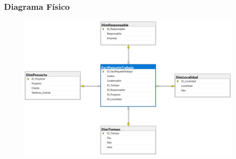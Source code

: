 \documentclass[12pt,letterpaper]{article}
\begin{document}
\subsubsection{\textbf{Diagrama Físico }}

	\begin{figure}[htb]
		\begin{center}
			\includegraphics[width=15cm]{./Imagenes/Ejercicio3_DiagramaFisico}
			
		\end{center}
	\end{figure}

\newpage
\end{document}
